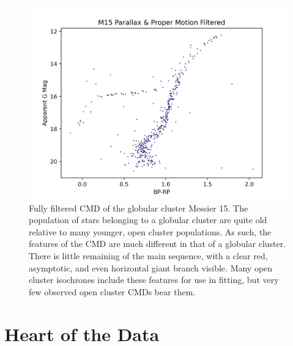 \documentclass[onecolumn,table,xcdraw,super]{aastex631}
\begin{document}
\begin{figure}[]
    \centering
      \includegraphics[width=4.75in]{figures/M15_cmd_filtered.png}
    \caption{Fully filtered CMD of the globular cluster Messier 15. The population of stars belonging to a globular cluster are quite old relative to many younger, open cluster populations. As such, the features of the CMD are much different in that of a globular cluster. There is little remaining of the main sequence, with a clear red, asymptotic, and even horizontal giant branch visible. Many open cluster isochrones include these features for use in fitting, but very few observed open cluster CMDs bear them.}
    \label{fig:M15_cmd_filtered}
\end{figure}

\section{Heart of the Data} \label{sec:dataUse}
\end{document}
